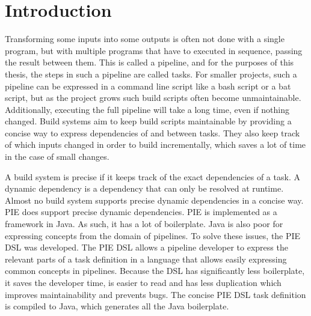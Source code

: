 
\chapter{\label{chap:introduction}Introduction}


Transforming some inputs into some outputs is often not done with a single program, but with multiple programs that have to executed in sequence, passing the result between them.
This is called a pipeline, and for the purposes of this thesis, the steps in such a pipeline are called tasks.
For smaller projects, such a pipeline can be expressed in a command line script like a bash script or a bat script, but as the project grows such build scripts often become unmaintainable.
Additionally, executing the full pipeline will take a long time, even if nothing changed.
Build systems aim to keep build scripts maintainable by providing a concise way to express dependencies of and between tasks.
They also keep track of which inputs changed in order to build incrementally, which saves a lot of time in the case of small changes.

A build system is precise if it keeps track of the exact dependencies of a task.
A dynamic dependency is a dependency that can only be resolved at runtime.
Almost no build system supports precise dynamic dependencies in a concise way.
PIE does support precise dynamic dependencies.
PIE is implemented as a framework in Java.
As such, it has a lot of boilerplate.
Java is also poor for expressing concepts from the domain of pipelines.
To solve these issues, the PIE DSL was developed.
The PIE DSL allows a pipeline developer to express the relevant parts of a task definition in a language that allows easily expressing common concepts in pipelines.
Because the DSL has significantly less boilerplate, it saves the developer time, is easier to read and has less duplication which improves maintainability and prevents bugs. 
The concise PIE DSL task definition is compiled to Java, which generates all the Java boilerplate.

